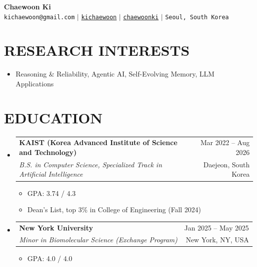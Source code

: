 \documentclass[letterpaper,11pt]{article}
\makeatletter
\newcommand{\resumeItem}[1]{
  \item\small{
    {#1 \vspace{0pt}}
  }
}
\newcommand{\resumeSubheading}[4]{
  \vspace{-1pt}\item
    \begin{tabular*}{\textwidth}[t]{l@{\extracolsep{\fill}}r}
      \textbf{#1} & {\color{dark-grey}\small #2}\vspace{1pt}\\ %
      \textit{#3} & {\color{dark-grey} \small #4}\\ %
    \end{tabular*}\vspace{-6pt}
}
\newcommand{\resumeSubHeadingListStart}{\begin{itemize}[leftmargin=0in, label={}]}
\newcommand{\resumeSubHeadingListEnd}{\end{itemize}}
\newcommand{\resumeItemListStart}{\begin{itemize}}
\newcommand{\resumeItemListEnd}{\end{itemize}\vspace{0pt}}
\makeatother
\begin{document}
\begin{center}
    \textbf{\Huge Chaewoon Ki} \\ \vspace{5pt}
    \hspace{1pt} \faEnvelope \hspace{2pt} \texttt{kichaewoon@gmail.com} \hspace{1pt} $|$
    \hspace{1pt} \faGithub \hspace{2pt} \href{https://kichaewoon.github.io}{\texttt{kichaewoon}} \hspace{1pt} $|$
    \hspace{1pt} \faLinkedin \hspace{2pt} \href{https://www.linkedin.com/in/chaewoonki}{\texttt{chaewoonki}} \hspace{1pt} $|$
    \hspace{1pt} \faMapMarker* \hspace{2pt}\texttt{Seoul, South Korea}
    \\ \vspace{-3pt}
\end{center}

\section{RESEARCH INTERESTS}
\resumeSubHeadingListStart
\item {\small{
Reasoning \& Reliability, Agentic AI, Self-Evolving Memory, LLM Applications
}}
\resumeSubHeadingListEnd

\section{EDUCATION}
  \resumeSubHeadingListStart
    \resumeSubheading
      {KAIST (Korea Advanced Institute of Science and Technology)}{Mar 2022 -- Aug 2026}
      {B.S. in Computer Science, Specialized Track in Artificial Intelligence}{Daejeon, South Korea}
      \resumeItemListStart
        \resumeItem{GPA: 3.74 / 4.3}
        \resumeItem{Dean's List, top 3\% in College of Engineering (Fall 2024)}
      \resumeItemListEnd
    \resumeSubheading
      {New York University}{Jan 2025 -- May 2025}
      {Minor in Biomolecular Science (Exchange Program)}{New York, NY, USA}
      \resumeItemListStart
        \resumeItem{GPA: 4.0 / 4.0}
      \resumeItemListEnd
  \resumeSubHeadingListEnd
\end{document}
